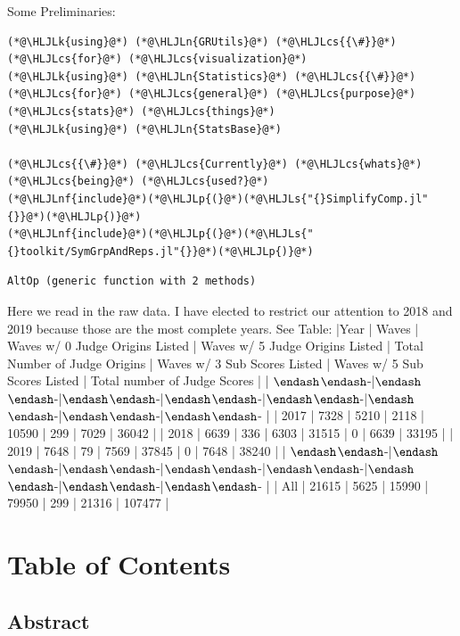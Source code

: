 \documentclass[12pt,a4paper]{article}
\newcommand{\HLJLk}[1]{\textcolor[RGB]{148,91,176}{\textbf{#1}}}
\newcommand{\HLJLn}[1]{#1}
\newcommand{\HLJLnf}[1]{\textcolor[RGB]{66,102,213}{#1}}
\newcommand{\HLJLs}[1]{\textcolor[RGB]{201,61,57}{#1}}
\newcommand{\HLJLp}[1]{#1}
\newcommand{\HLJLcs}[1]{\textcolor[RGB]{153,153,119}{\textit{#1}}}
\begin{document}
Some Preliminaries:


\begin{lstlisting}
(*@\HLJLk{using}@*) (*@\HLJLn{GRUtils}@*) (*@\HLJLcs{{\#}}@*) (*@\HLJLcs{for}@*) (*@\HLJLcs{visualization}@*)
(*@\HLJLk{using}@*) (*@\HLJLn{Statistics}@*) (*@\HLJLcs{{\#}}@*) (*@\HLJLcs{for}@*) (*@\HLJLcs{general}@*) (*@\HLJLcs{purpose}@*) (*@\HLJLcs{stats}@*) (*@\HLJLcs{things}@*)
(*@\HLJLk{using}@*) (*@\HLJLn{StatsBase}@*)

(*@\HLJLcs{{\#}}@*) (*@\HLJLcs{Currently}@*) (*@\HLJLcs{whats}@*) (*@\HLJLcs{being}@*) (*@\HLJLcs{used?}@*)
(*@\HLJLnf{include}@*)(*@\HLJLp{(}@*)(*@\HLJLs{"{}SimplifyComp.jl"{}}@*)(*@\HLJLp{)}@*)
(*@\HLJLnf{include}@*)(*@\HLJLp{(}@*)(*@\HLJLs{"{}toolkit/SymGrpAndReps.jl"{}}@*)(*@\HLJLp{)}@*)
\end{lstlisting}

\begin{lstlisting}
AltOp (generic function with 2 methods)
\end{lstlisting}


Here we read in the raw data. I have elected to restrict our attention to 2018 and 2019 because those are the most complete years. See Table: |Year | Waves | Waves w/ 0 Judge Origins Listed | Waves w/ 5 Judge Origins Listed | Total Number of Judge Origins | Waves w/ 3 Sub Scores Listed | Waves w/ 5 Sub Scores Listed | Total number of Judge Scores | | \ensuremath{\endash}\ensuremath{\endash}-|\ensuremath{\endash}\ensuremath{\endash}-|\ensuremath{\endash}\ensuremath{\endash}-|\ensuremath{\endash}\ensuremath{\endash}-|\ensuremath{\endash}\ensuremath{\endash}-|\ensuremath{\endash}\ensuremath{\endash}-|\ensuremath{\endash}\ensuremath{\endash}-|\ensuremath{\endash}\ensuremath{\endash}- | | 2017 | 7328 | 5210 | 2118 | 10590 | 299 | 7029 | 36042 | | 2018 | 6639 | 336 | 6303 | 31515 | 0 | 6639 | 33195 | | 2019 | 7648 | 79 | 7569 | 37845 | 0 | 7648 | 38240 | | \ensuremath{\endash}\ensuremath{\endash}-|\ensuremath{\endash}\ensuremath{\endash}-|\ensuremath{\endash}\ensuremath{\endash}-|\ensuremath{\endash}\ensuremath{\endash}-|\ensuremath{\endash}\ensuremath{\endash}-|\ensuremath{\endash}\ensuremath{\endash}-|\ensuremath{\endash}\ensuremath{\endash}-|\ensuremath{\endash}\ensuremath{\endash}- | | All | 21615 | 5625 | 15990 | 79950 | 299 | 21316 | 107477 |


\section{Table of Contents}
\subsection{Abstract}
\end{document}
